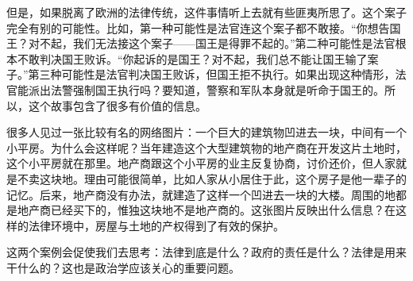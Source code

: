 但是，如果脱离了欧洲的法律传统，这件事情听上去就有些匪夷所思了。这个案子完全有别的可能性。比如，第一种可能性是法官连这个案子都不敢接。“你想告国王？对不起，我们无法接这个案子——国王是得罪不起的。”第二种可能性是法官根本不敢判决国王败诉。“你起诉的是国王？对不起，我们总不能让国王输了案子。”第三种可能性是法官判决国王败诉，但国王拒不执行。如果出现这种情形，法官能派出法警强制国王执行吗？要知道，警察和军队本身就是听命于国王的。所以，这个故事包含了很多有价值的信息。

很多人见过一张比较有名的网络图片：一个巨大的建筑物凹进去一块，中间有一个小平房。为什么会这样呢？当年建造这个大型建筑物的地产商在开发这片土地时，这个小平房就在那里。地产商跟这个小平房的业主反复协商，讨价还价，但人家就是不卖这块地。理由可能很简单，比如人家从小居住于此，这个房子是他一辈子的记忆。后来，地产商没有办法，就建造了这样一个凹进去一块的大楼。周围的地都是地产商已经买下的，惟独这块地不是地产商的。这张图片反映出什么信息？在这样的法律环境中，房屋与土地的产权得到了有效的保护。

这两个案例会促使我们去思考：法律到底是什么？政府的责任是什么？法律是用来干什么的？这也是政治学应该关心的重要问题。


